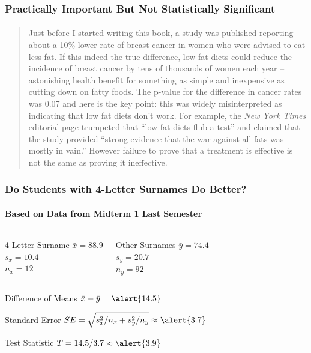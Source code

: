 \documentclass[handout]{beamer}
\begin{document}
\begin{frame}
\frametitle{Practically Important But Not Statistically Significant}
\framesubtitle{\href{http://www.amazon.com/p-value-Stories-Actually-Understand-Statistics/dp/0321629302}{}}
\footnotesize
\begin{quote}
Just before I started writing this book, a study was published reporting about a 10\% lower rate of breast cancer in women who were advised to eat less fat. If this indeed the true difference, low fat diets could reduce the incidence of breast cancer by tens of thousands of women each year -- astonishing health benefit for something as simple and inexpensive as cutting down on fatty foods. The p-value for the difference in cancer rates was 0.07 and here is the key point: this was widely misinterpreted as indicating that low fat diets don't work. For example, the \emph{New York Times} editorial page trumpeted that ``low fat diets flub a test'' and claimed that the study provided ``strong evidence that the war against all fats was mostly in vain.'' \alert{However failure to prove that a treatment is effective is not the same as proving it ineffective.}
\end{quote}
\end{frame}
\begin{frame}[c]\frametitle{Do Students with 4-Letter Surnames Do Better?}
 \framesubtitle{Based on Data from Midterm 1 Last Semester}
    \begin{columns}
    	 \begin{block}
    		{4-Letter Surname}
    			$\bar{x} = 88.9$\\
    			$s_x = 10.4$\\
    			$n_x = 12$
    	\end{block} 
    	 \begin{block}
    		{Other Surnames}
    			$\bar{y} = 74.4$\\
    			$s_y = 20.7$\\
    			$n_y = 92$
    	\end{block}
    \end{columns}

\vspace{1em}
\begin{block}
	{Difference of Means}
	$\bar{x} - \bar{y} = \alert{14.5}$
\end{block}
\begin{block}
	{Standard Error}
	$\displaystyle SE = \sqrt{s_x^2/n_x + s_y^2/n_y} \approx \alert{3.7}$
\end{block}
\begin{block}
	{Test Statistic}
	$T = 14.5 / 3.7 \approx \alert{3.9}$
\end{block}
\end{frame}
\end{document}
